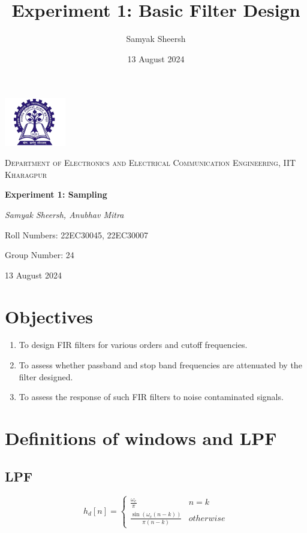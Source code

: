 \documentclass{article}
\title{Experiment 1: Basic Filter Design}
\author{Samyak Sheersh}
\date{13 August 2024}
\begin{document}
\begin{titlepage}
    \centering
    \includegraphics[width=0.2\textwidth]{KGP_logo.png}\par\vspace{1cm}
    {\scshape\LARGE Department of Electronics and Electrical Communication Engineering, IIT Kharagpur\par}
    \vspace{1cm}
    {\huge\bfseries Experiment 1: Sampling\par}
    \vspace{1.5cm}
    {\Large\itshape Samyak Sheersh, Anubhav Mitra\par}
    \vfill
    {\large Roll Numbers: 22EC30045, 22EC30007\par}
    {\large Group Number: 24\par}
    \vfill
    {\large 13 August 2024\par}
\end{titlepage}

\section{Objectives}
\begin{enumerate}
  \item To design FIR filters for various orders and cutoff frequencies.
  \item To assess whether passband and stop band frequencies are attenuated by the filter designed.
  \item To assess the response of such FIR filters to noise contaminated signals. 
\end{enumerate}

\section{Definitions of windows and LPF}

\subsection{LPF}
\begin{equation}
  h_d[n] = \begin{cases} \frac{\omega_c}{\pi} & n=k  \\ \frac{\sin(\omega_c (n-k))}{\pi(n-k)} & otherwise \end{cases}
\end{equation}
\end{document}
